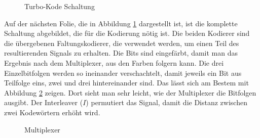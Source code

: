 \begin{figure}[!ht]
\centering
{}
\caption{Turbo-Kode Schaltung}
\label{pic:TurboEncode}
\end{figure}  

Auf der nächsten Folie, die in Abbildung \ref{pic:TurboEncode} dargestellt ist, ist die komplette Schaltung abgebildet, die für die Kodierung nötig ist. Die beiden Kodierer sind die übergebenen Faltungskodierer, die verwendet werden, um einen Teil des resultierenden Signals zu erhalten. Die Bits sind eingefärbt, damit man das Ergebnis nach dem Multiplexer, aus den Farben folgern kann. Die drei Einzelbitfolgen werden so ineinander verschachtelt, damit jeweils ein Bit aus Teilfolge eins, zwei und drei hintereinander sind. Das lässt sich am Bestem mit Abbildung \ref{pic:TurboEncodeMultiplexer} zeigen. Dort sieht man sehr leicht, wie der Multiplexer die Bitfolgen ausgibt. Der Interleaver ($I$) permutiert das Signal, damit die Distanz zwischen zwei Kodewörtern erhöht wird.

\begin{figure}[!ht]
\centering
{}
\caption{Multiplexer}
\label{pic:TurboEncodeMultiplexer}
\end{figure}  

